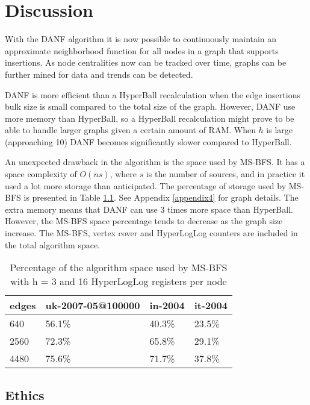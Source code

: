 \chapter{Discussion}
With the DANF algorithm it is now possible to continuously maintain an approximate neighborhood function for all nodes in a graph that supports insertions. As node centralities now can be tracked over time, graphs can be further mined for data and trends can be detected. 

DANF is more efficient than a HyperBall recalculation when the edge insertions bulk size is small compared to the total size of the graph. However, DANF use more memory than HyperBall, so a HyperBall recalculation might prove to be able to handle larger graphs given a certain amount of RAM. When $h$ is large (approaching 10) DANF becomes significantly slower compared to HyperBall.

An unexpected drawback in the algorithm is the space used by MS-BFS. It has a space complexity of $O(ns)$, where $s$ is the number of sources, and in practice it used a lot more storage than anticipated. The percentage of storage used by MS-BFS is presented in Table \ref{table:ms-bfs_space}. See Appendix \ref{appendix4} for graph details. The extra memory means that DANF can use 3 times more space than HyperBall. However, the MS-BFS space percentage tends to decrease as the graph size increase. The MS-BFS, vertex cover and HyperLogLog counters are included in the total algorithm space.

\begin{table}[h]
    \center
    \begin{tabular}{ | l | l | l | l |}
        \hline
        edges & uk-2007-05@100000 & in-2004 & it-2004 \\ \hline
        640  & 56.1\% & 40.3\% & 23.5\% \\ \hline
        2560 & 72.3\% & 65.8\% & 29.1\% \\ \hline 
        4480 & 75.6\% & 71.7\% & 37.8\% \\
        \hline
    \end{tabular}
    \captionsetup{justification=centering}
    \caption{Percentage of the algorithm space used by MS-BFS with h = 3 and 16 HyperLogLog registers per node}
    \label{table:ms-bfs_space}
\end{table}

\section{Ethics}

